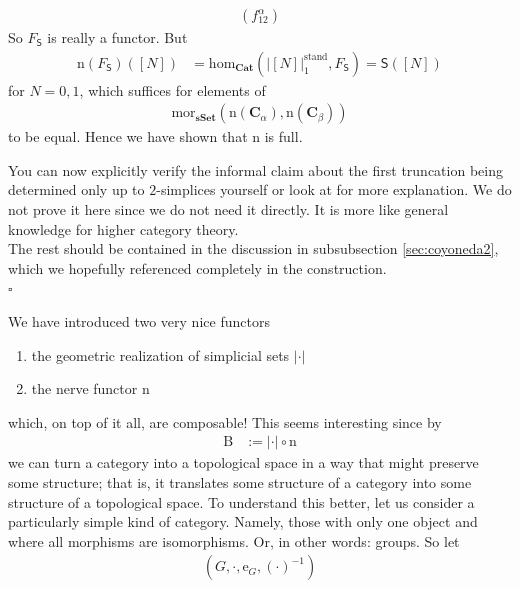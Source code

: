\begin{prf}
\begin{description}
\begin{align*}
  \left(
    f_{12}^{\alpha}
  \right)
\end{align*}
So $F_{\mathsf{S}}$ is really a functor.
But
\begin{align*}
  \mathrm{n}(F_{\mathsf{S}})([N])
  &=
  \mathrm{hom}_{\mathbf{Cat}}
  \left(
    \vert
      [N]
    \vert_{1}^{\textrm{stand}},
    F_{\mathsf{S}}
  \right)
  =
  \mathsf{S}([N])
\end{align*}
for $N = 0,1$, which suffices for elements of
\begin{align*}
  \mathrm{mor}_{\mathbf{sSet}}
  \left(
    \mathrm{n}(\mathbf{C}_{\alpha}),
    \mathrm{n}(\mathbf{C}_{\beta})
  \right)
\end{align*}
to be equal.
Hence we have shown that $\mathrm{n}$ is full.
\end{description}
You can now explicitly verify the informal claim about the first truncation being determined only up to $2$-simplices yourself or look at \cite{d09756a3} for more explanation.
We do not prove it here since we do not need it directly.
It is more like general knowledge for higher category theory.
\\
The rest should be contained in the discussion in subsubsection \ref{sec:coyoneda2}, which we hopefully referenced completely in the construction.
\\
\phantom{proven}
\hfill
$\square$
\end{prf}
We have introduced two very nice functors
\begin{enumerate}
\item[$\bullet$]
the geometric realization of simplicial sets $\vert \cdot \vert$
\item[$\bullet$]
the nerve functor $\mathrm{n}$
\end{enumerate}
which, on top of it all, are composable!
This seems interesting since by
\begin{align*}
  \mathrm{B}
  &:=
  \vert
    \cdot
  \vert
  \circ
  \mathrm{n}
\end{align*}
we can turn a category into a topological space in a way that might preserve some structure; that is, it translates some structure of a category into some structure of a topological space.
To understand this better, let us consider a particularly simple kind of category.
Namely, those with only one object and where all morphisms are isomorphisms.
Or, in other words: groups.
So let
\begin{align*}
  \left(
    G,
    \cdot,
    \mathrm{e}_{G},
    (\cdot)^{-1}
  \right)
\end{align*}
